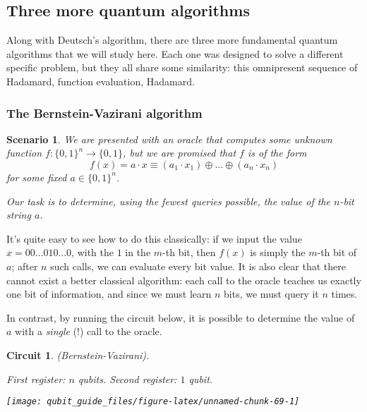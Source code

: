 \documentclass[fleqn]{article}
\newtheorem*{scenario}{Scenario}
\newtheorem*{circuit}{Circuit}
\begin{document}
\hypertarget{three-more-quantum-algorithms}{%
\subsection{Three more quantum algorithms}\label{three-more-quantum-algorithms}}

Along with Deutsch's algorithm, there are three more fundamental quantum algorithms that we will study here.
Each one was designed to solve a different specific problem, but they all share some similarity: this omnipresent sequence of Hadamard, function evaluation, Hadamard.

\hypertarget{the-bernstein-vazirani-algorithm}{%
\subsubsection{The Bernstein-Vazirani algorithm}\label{the-bernstein-vazirani-algorithm}}

\begin{scenario}
We are presented with an oracle that computes some unknown function \(f\colon\{0,1\}^n\to\{0,1\}\), but we are promised that \(f\) is of the form
\[
  f(x) = a\cdot x
  \equiv (a_1\cdot x_1) \oplus \ldots \oplus (a_n\cdot x_n)
\]
for some fixed \(a\in\{0,1\}^n\).

Our task is to determine, using the fewest queries possible, the value of the \(n\)-bit string \(a\).

\end{scenario}

It's quite easy to see how to do this classically: if we input the value \(x=00\ldots010\ldots0\), with the \(1\) in the \(m\)-th bit, then \(f(x)\) is simply the \(m\)-th bit of \(a\); after \(n\) such calls, we can evaluate every bit value.
It is also clear that there cannot exist a better classical algorithm: each call to the oracle teaches us exactly one bit of information, and since we must learn \(n\) bits, we must query it \(n\) times.

In contrast, by running the circuit below, it is possible to determine the value of \(a\) with a \emph{single} (!) call to the oracle.

\begin{circuit}

(Bernstein-Vazirani).

\emph{First register: \(n\) qubits. Second register: \(1\) qubit.}

\begin{center}\texttt{[image: qubit\_guide\_files/figure-latex/unnamed-chunk-69-1]} \end{center}


\end{circuit}
\end{document}

